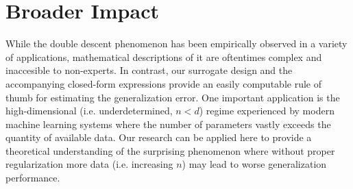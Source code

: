 \documentclass[11pt]{article}
\begin{document}
% 




\ifisarxiv\else
  \section*{Broader Impact}

  While the double descent phenomenon has been empirically observed in a variety
  of applications, mathematical descriptions of it are oftentimes complex and
  inaccesible to non-experts. In contrast, our surrogate design and the
  accompanying closed-form expressions provide an easily computable rule of thumb
  for estimating the generalization error. One important application is
  the high-dimensional (i.e. underdetermined, $n < d$) regime
  experienced by modern machine learning systems where the number of
  parameters vastly exceeds the quantity of
  available data. Our research can be applied here to provide a theoretical
  understanding of the surprising phenomenon where without proper
  regularization \citep{nakkiran2020optimal} more data (i.e. increasing $n$)
  may lead to worse generalization performance.
\end{document}
